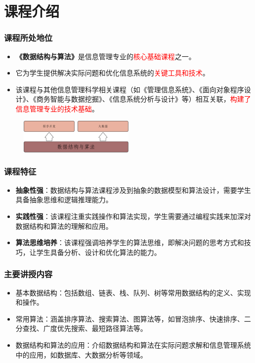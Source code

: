 \section{课程介绍}

\begin{frame}
    \frametitle{课程所处地位}

    \begin{itemize}
        \item \textbf{《数据结构与算法》}是信息管理专业的\textcolor{red}{核心基础课程}之一。
        \item 它为学生提供解决实际问题和优化信息系统的\textcolor{red}{关键工具和技术}。
        \item 该课程与其他信息管理科学相关课程（如《管理信息系统》、《面向对象程序设计》、《商务智能与数据挖掘》、《信息系统分析与设计》等）相互关联，\textcolor{red}{构建了信息管理专业的技术基础}。
    \end{itemize}
    \begin{figure}
        \centering
        \includegraphics[width = 0.5\textwidth]{./images/import.pdf}
    \end{figure}

\end{frame}

\begin{frame}
    \frametitle{课程特征}

    \begin{itemize}
        \item \textbf{抽象性强}：数据结构与算法课程涉及到抽象的数据模型和算法设计，需要学生具备抽象思维和逻辑推理能力。
        \item \textbf{实践性强}：该课程注重实践操作和算法实现，学生需要通过编程实践来加深对数据结构和算法的理解和应用。
        \item \textbf{算法思维培养}：该课程强调培养学生的算法思维，即解决问题的思考方式和技巧，让学生具备分析、设计和优化算法的能力。
    \end{itemize}

\end{frame}

\begin{frame}
    \frametitle{主要讲授内容}

    \begin{itemize}
        \item 基本数据结构：包括数组、链表、栈、队列、树等常用数据结构的定义、实现和操作。
        \item 常用算法：涵盖排序算法、搜索算法、图算法等，如冒泡排序、快速排序、二分查找、广度优先搜索、最短路径算法等。
        \item 数据结构和算法的应用：介绍数据结构和算法在实际问题求解和信息管理系统中的应用，如数据库、大数据分析等领域。
    \end{itemize}

\end{frame}


